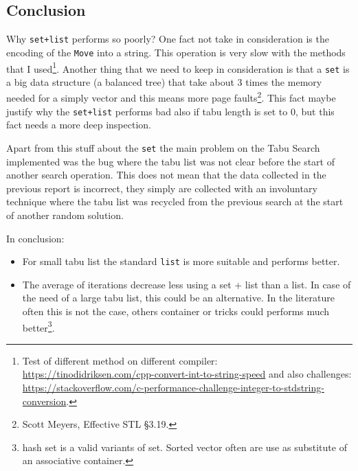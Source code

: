 \documentclass[]{article}
\begin{document}
\subsection{Conclusion}
	Why \verb|set+list| performs so poorly? One fact not take in consideration is the encoding of the \verb|Move| into a string. This operation is very slow with the methods that I used\footnote{Test of different method on different compiler: \\ \href{https://tinodidriksen.com/2010/02/cpp-convert-int-to-string-speed/}{https://tinodidriksen.com/cpp-convert-int-to-string-speed} and also challenges: \\ \href{https://stackoverflow.com/questions/4351371/c-performance-challenge-integer-to-stdstring-conversion}{https://stackoverflow.com/c-performance-challenge-integer-to-stdstring-conversion}.}. 
	Another thing that we need to keep in consideration is that a \verb|set| is a big data structure (a balanced tree) that take about 3 times the memory needed for a simply vector and this means more page faults\footnote{Scott Meyers, Effective STL §3.19.}. This fact maybe justify why the \verb|set+list| performs bad also if tabu length is set to 0, but this fact needs a more deep inspection.
	
	Apart from this stuff about the \verb|set| the main problem on the Tabu Search implemented was the bug where the tabu list was not clear before the start of another search operation. This does not mean that the data collected in the previous report is incorrect, they simply are collected with an involuntary technique where the tabu list was recycled from the previous search at the start of another random solution. 
	
	In conclusion:
	\begin{itemize}
		\item For small tabu list the standard \verb|list| is more suitable and performs better.
		\item The average of iterations decrease less using a set + list than a list. In case of the need of a large tabu list, this could be an alternative. In the literature often this is not the case, others container or tricks could performs much better\footnote{hash set is a valid variants of set. Sorted vector often are use as substitute of an associative container.}.
	\end{itemize}
	
	

	
\end{document}
